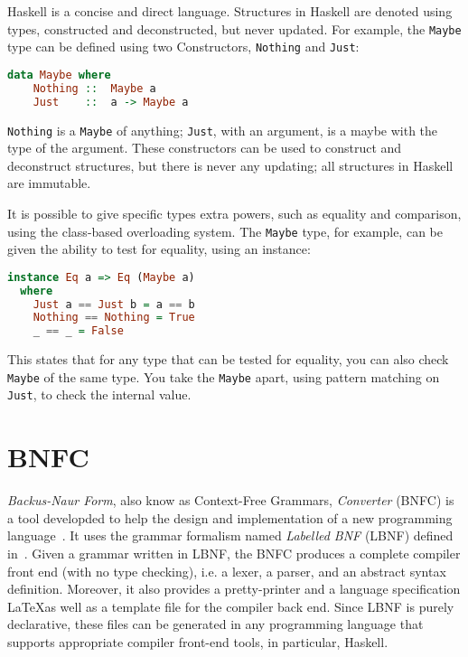 Haskell is a concise and direct language. Structures in Haskell are denoted
using types, constructed and deconstructed, but never updated. For example, the
\texttt{Maybe} type can be defined using two Constructors, \texttt{Nothing} and
\texttt{Just}:

\begin{lstlisting}[language=Haskell]
data Maybe where
    Nothing ::  Maybe a
    Just    ::  a -> Maybe a
\end{lstlisting}

\texttt{Nothing} is a \texttt{Maybe} of anything; \texttt{Just}, with an
argument, is a maybe with the type of the argument. These constructors can be
used to construct and deconstruct structures, but there is never any updating;
all structures in Haskell are immutable.

It is possible to give specific types extra powers, such as equality and
comparison, using the class-based overloading system. The \texttt{Maybe} type,
for example, can be given the ability to test for equality, using an instance:

\begin{lstlisting}[language=Haskell]
instance Eq a => Eq (Maybe a)
  where
    Just a == Just b = a == b
    Nothing == Nothing = True
    _ == _ = False
\end{lstlisting}

This states that for any type that can be tested for equality, you can also
check \texttt{Maybe} of the same type. You take the \texttt{Maybe} apart, using
pattern matching on \texttt{Just}, to check the internal value.


\section{BNFC}
\textit{Backus-Naur Form}, also know as Context-Free Grammars,
\textit{Converter} (BNFC) is a tool developded to help the design and
implementation of a new programming language~\cite{bnfcsite}. 
It uses the grammar formalism named \textit{Labelled BNF} (LBNF) defined
in~\cite{bnfc}. Given a grammar written in LBNF, the BNFC produces a complete
compiler front end (with no type checking), i.e. a lexer, a parser, and an
abstract syntax definition. Moreover, it also provides a pretty-printer and a
language specification \LaTeX as well as a template file for the compiler back
end. Since LBNF is purely declarative, these files can be generated in any
programming language that supports appropriate compiler front-end tools, in
particular, Haskell.

